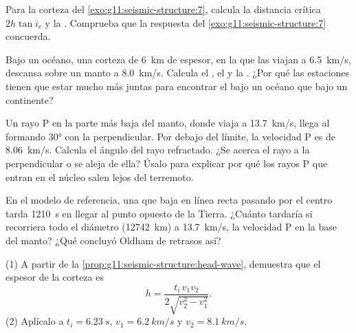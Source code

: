 \begin{exercise}[$\star\star$]\label{exo:g11:seismic-structure:8}
Para la corteza del \cref{exo:g11:seismic-structure:7}, calcula la distancia
crítica $2h\tan i_c$ y la . Comprueba que la respuesta del
\cref{exo:g11:seismic-structure:7} concuerda.
\end{exercise}

\begin{exercise}[$\star\star$]\label{exo:g11:seismic-structure:9}
Bajo un océano, una corteza de \qty{6}{km} de espesor, en la que las 
viajan a \qty{6.5}{km/s}, descansa sobre un manto a \qty{8.0}{km/s}. Calcula
el , el  y la . ¿Por qué
las estaciones tienen que estar mucho más juntas para encontrar el  bajo
un océano que bajo un continente?
\end{exercise}

\begin{exercise}[$\star\star$]\label{exo:g11:seismic-structure:10}
Un rayo P en la parte más baja del manto, donde viaja a \qty{13.7}{km/s},
llega al  formando \ang{30} con la perpendicular. Por
debajo del límite, la velocidad P es de \qty{8.06}{km/s}. Calcula el ángulo
del rayo refractado. ¿Se acerca el rayo a la perpendicular o se aleja de
ella? Úsalo para explicar por qué los rayos P que entran en el núcleo salen
lejos del terremoto.
\end{exercise}

\begin{exercise}[$\star\star$]\label{exo:g11:seismic-structure:11}
En el modelo de referencia, una  que baja en línea recta pasando por el
centro tarda \qty{1210}{s} en llegar al punto opuesto de la Tierra. ¿Cuánto
tardaría si recorriera todo el diámetro (\qty{12742}{km}) a
\qty{13.7}{km/s}, la velocidad P en la base del manto? ¿Qué concluyó Oldham
de retrasos así?
\end{exercise}

\begin{exercise}[$\star\star\star$]\label{exo:g11:seismic-structure:12}
(1) A partir de la \cref{prop:g11:seismic-structure:head-wave}, demuestra que
el espesor de la corteza es
\[
  h = \frac{t_i\,v_1 v_2}{2\sqrt{v_2^2 - v_1^2}}.
\]
(2) Aplícalo a $t_i = \qty{6.23}{s}$, $v_1 = \qty{6.2}{km/s}$ y
$v_2 = \qty{8.1}{km/s}$.
\end{exercise}

